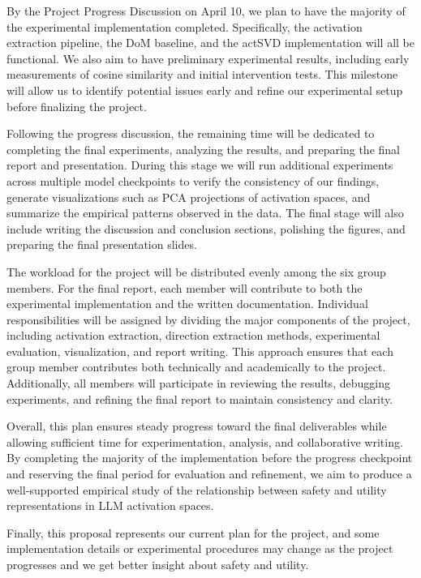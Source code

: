 By the Project Progress Discussion on April 10, we plan to have the majority of the experimental implementation completed. Specifically, the activation extraction pipeline, the DoM baseline, and the actSVD implementation will all be functional. We also aim to have preliminary experimental results, including early measurements of cosine similarity and initial intervention tests. This milestone will allow us to identify potential issues early and refine our experimental setup before finalizing the project.

Following the progress discussion, the remaining time will be dedicated to completing the final experiments, analyzing the results, and preparing the final report and presentation. During this stage we will run additional experiments across multiple model checkpoints to verify the consistency of our findings, generate visualizations such as PCA projections of activation spaces, and summarize the empirical patterns observed in the data. The final stage will also include writing the discussion and conclusion sections, polishing the figures, and preparing the final presentation slides.

The workload for the project will be distributed evenly among the six group members. For the final report, each member will contribute to both the experimental implementation and the written documentation. Individual responsibilities will be assigned by dividing the major components of the project, including activation extraction, direction extraction methods, experimental evaluation, visualization, and report writing. This approach ensures that each group member contributes both technically and academically to the project. Additionally, all members will participate in reviewing the results, debugging experiments, and refining the final report to maintain consistency and clarity.

Overall, this plan ensures steady progress toward the final deliverables while allowing sufficient time for experimentation, analysis, and collaborative writing. By completing the majority of the implementation before the progress checkpoint and reserving the final period for evaluation and refinement, we aim to produce a well-supported empirical study of the relationship between safety and utility representations in LLM activation spaces.

Finally, this proposal represents our current plan for the project, and some implementation details or experimental procedures may change as the project progresses and we get better insight about safety and utility. 
